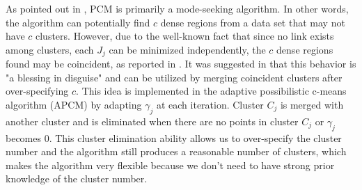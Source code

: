 \documentclass[journal]{IEEEtran}
\theoremstyle{definition}
\begin{document}
As pointed out in \cite{krishnapuram_possibilistic_1996}, PCM is primarily a mode-seeking algorithm. In other words, the algorithm can potentially find $c$ dense regions from a data set that may not have $c$ clusters. However, due to the well-known fact that since no link exists among clusters, each $J_j$ can be minimized independently, the $c$ dense regions found may be coincident, as reported in \cite{barni_comments_1996}. It was suggested in \cite{krishnapuram_possibilistic_1996} that this behavior is "a blessing in disguise" and can be utilized by merging coincident clusters after over-specifying $c$. This idea is implemented in the adaptive possibilistic c-means algorithm (APCM) \cite{xenaki_novel_2016} by adapting $\gamma_j$ at each iteration. Cluster $C_j$ is merged with another cluster and is eliminated when there are no points in cluster $C_j$ or $\gamma_j$ becomes $0$. This cluster elimination ability allows us to over-specify the cluster number and the algorithm still produces a reasonable number of clusters, which makes the algorithm very flexible because we don't need to have strong prior knowledge of the cluster number.
\end{document}
